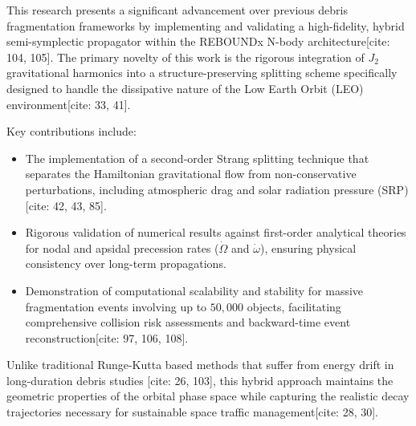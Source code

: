 \documentclass[letterpaper, paper,11pt]{AAS}
\begin{document}
This research presents a significant advancement over previous debris fragmentation frameworks \cite{Puerta2025} by implementing and validating a high-fidelity, hybrid semi-symplectic propagator within the REBOUNDx N-body architecture[cite: 104, 105]. The primary novelty of this work is the rigorous integration of $J_2$ gravitational harmonics into a structure-preserving splitting scheme specifically designed to handle the dissipative nature of the Low Earth Orbit (LEO) environment[cite: 33, 41]. 

Key contributions include:
\begin{itemize}
    \item The implementation of a second-order Strang splitting technique that separates the Hamiltonian gravitational flow from non-conservative perturbations, including atmospheric drag and solar radiation pressure (SRP)[cite: 42, 43, 85].
    \item Rigorous validation of numerical results against first-order analytical theories for nodal and apsidal precession rates ($\dot{\Omega}$ and $\dot{\omega}$), ensuring physical consistency over long-term propagations.
    \item Demonstration of computational scalability and stability for massive fragmentation events involving up to $50,000$ objects, facilitating comprehensive collision risk assessments and backward-time event reconstruction[cite: 97, 106, 108].
\end{itemize}

Unlike traditional Runge-Kutta based methods that suffer from energy drift in long-duration debris studies [cite: 26, 103], this hybrid approach maintains the geometric properties of the orbital phase space while capturing the realistic decay trajectories necessary for sustainable space traffic management[cite: 28, 30].
\end{document}
